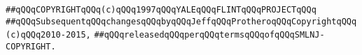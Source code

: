 \newline
\verb|##qQQqCOPYRIGHTqQQq(c)qQQq1997qQQqYALEqQQqFLINTqQQqPROJECTqQQq|\newline
\verb|##qQQqSubsequentqQQqchangesqQQqbyqQQqJeffqQQqProtheroqQQqCopyrightqQQq(c)qQQq2010-2015,|\newline
\verb|##qQQqreleasedqQQqperqQQqtermsqQQqofqQQqSMLNJ-COPYRIGHT.|\newline

